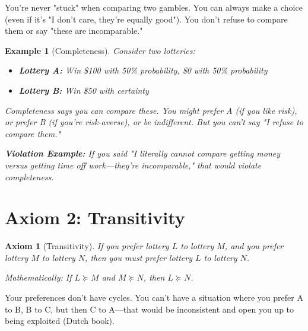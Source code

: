 \documentclass[12pt]{article}
\newtheorem{axiom}{Axiom}
\newtheorem{example}{Example}
\begin{document}
\begin{tcolorbox}[colback=intuitioncolor,colframe=orange!75!black,title=Intuition]
You're never "stuck" when comparing two gambles. You can always make a choice (even if it's "I don't care, they're equally good"). You don't refuse to compare them or say "these are incomparable."
\end{tcolorbox}

\begin{example}[Completeness]
Consider two lotteries:
\begin{itemize}
\item \textbf{Lottery A:} Win \$100 with 50\% probability, \$0 with 50\% probability
\item \textbf{Lottery B:} Win \$50 with certainty
\end{itemize}

Completeness says you can compare these. You might prefer A (if you like risk), or prefer B (if you're risk-averse), or be indifferent. But you can't say "I refuse to compare them."

\vspace{0.2cm}

\textbf{Violation Example:} If you said "I literally cannot compare getting money versus getting time off work—they're incomparable," that would violate completeness.
\end{example}

\newpage

\section{Axiom 2: Transitivity}

\begin{axiom}[Transitivity]
If you prefer lottery $L$ to lottery $M$, and you prefer lottery $M$ to lottery $N$, then you must prefer lottery $L$ to lottery $N$.

Mathematically: If $L \succeq M$ and $M \succeq N$, then $L \succeq N$.
\end{axiom}

\begin{tcolorbox}[colback=intuitioncolor,colframe=orange!75!black,title=Intuition]
Your preferences don't have cycles. You can't have a situation where you prefer A to B, B to C, but then C to A—that would be inconsistent and open you up to being exploited (Dutch book).
\end{tcolorbox}
\end{document}
